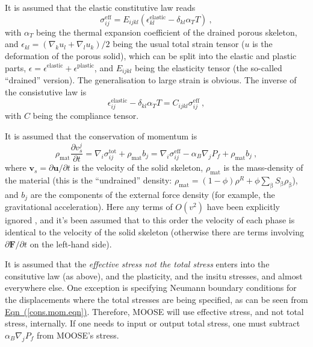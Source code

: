 \documentclass[12pt]{report}
\def\phase{\mathrm{\beta}}
\def\flux{\mathbf{F}}
\begin{document}
It is assumed that the elastic constitutive law reads
\begin{equation}
\sigma_{ij}^{\mathrm{eff}} = E_{ijkl}(\epsilon^{\mathrm{elastic}}_{kl} -
\delta_{kl}\alpha_{T}T)\ ,
\label{eqn.elasticity}
\end{equation}
with $\alpha_{T}$ being the thermal expansion coefficient of the
drained porous skeleton, and $\epsilon_{kl} = (\nabla_{k}u_{l} +
\nabla_{l}u_{k})/2$ being the usual total strain tensor ($u$ is the
deformation of the porous solid), which can be split into the elastic
and plastic parts, $\epsilon = \epsilon^{\mathrm{elastic}} +
\epsilon^{\mathrm{plastic}}$, and $E_{ijkl}$ being the elasticity
tensor (the so-called ``drained'' version).  The generalisation to
large strain is obvious.  The inverse of the consistutive law is
\begin{equation}
\epsilon^{\mathrm{elastic}}_{ij} - \delta_{kl}\alpha_{T}T = C_{ijkl}\sigma_{ij}^{\mathrm{eff}} \ ,
\end{equation}
with $C$ being the compliance tensor.

It is assumed that the conservation of momentum is
\begin{equation}
\rho_{\mathrm{mat}}\frac{\partial v_{s}^{j}}{\partial t} =
\nabla_{i}\sigma_{ij}^{\mathrm{tot}} + \rho_{\mathrm{mat}}b_{j} =
\nabla_{i}\sigma_{ij}^{\mathrm{eff}} - \alpha_{B}\nabla_{j} P_{f} + \rho_{\mathrm{mat}}b_{j} \ ,
\label{cons.mom.eqn}
\end{equation}
where ${\mathbf{v}}_{s} = \partial{\mathbf u}/\partial t$ is the
velocity of the solid skeleton, $\rho_{\mathrm{mat}}$ is the
mass-density of the material (this is the ``undrained'' density:
$\rho_{\mathrm{mat}} = (1 - \phi)\rho^{R} +
\phi\sum_{\phase}S_{\phase}\rho_{\phase}$), and $b_{j}$ are the
components of the external force density (for example, the
gravitational acceleration).  Here  any terms
of $O(v^{2})$ have been explicitly ignored , and it's been assumed that to this order the velocity of
each phase is identical to the velocity of the solid skeleton
(otherwise there are terms involving $\partial \flux/\partial t$ on
the left-hand side).

It is assumed that the {\em effective stress not the total stress}
enters into the consitutive law (as above), and the plasticity, and
the insitu stresses, and almost everywhere else.  One exception is
specifying Neumann boundary conditions for the displacements where the
total stresses are being specified, as can be seen from
\hyperref[cons.mom.eqn]{Eqn~(\ref*{cons.mom.eqn})}.  Therefore, MOOSE
will use effective stress, and not total stress, internally.  If one
needs to input or output total stress, one must subtract
$\alpha_{B}\nabla_{j} P_{f}$ from MOOSE's stress.
\end{document}
